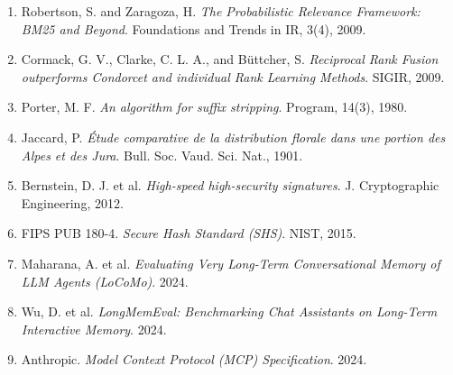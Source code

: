 \documentclass[11pt,a4paper]{article}
\begin{document}
\begin{enumerate}
  \item Robertson, S. and Zaragoza, H. \emph{The Probabilistic Relevance Framework: BM25 and Beyond}. Foundations and Trends in IR, 3(4), 2009.
  \item Cormack, G. V., Clarke, C. L. A., and Büttcher, S. \emph{Reciprocal Rank Fusion outperforms Condorcet and individual Rank Learning Methods}. SIGIR, 2009.
  \item Porter, M. F. \emph{An algorithm for suffix stripping}. Program, 14(3), 1980.
  \item Jaccard, P. \emph{Étude comparative de la distribution florale dans une portion des Alpes et des Jura}. Bull. Soc. Vaud. Sci. Nat., 1901.
  \item Bernstein, D. J. et al. \emph{High-speed high-security signatures}. J. Cryptographic Engineering, 2012.
  \item FIPS PUB 180-4. \emph{Secure Hash Standard (SHS)}. NIST, 2015.
  \item Maharana, A. et al. \emph{Evaluating Very Long-Term Conversational Memory of LLM Agents (LoCoMo)}. 2024.
  \item Wu, D. et al. \emph{LongMemEval: Benchmarking Chat Assistants on Long-Term Interactive Memory}. 2024.
  \item Anthropic. \emph{Model Context Protocol (MCP) Specification}. 2024.
\end{enumerate}
\end{document}
